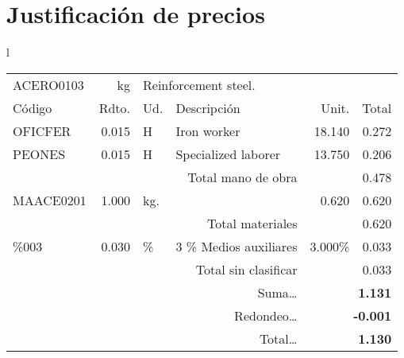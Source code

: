 \documentclass{book}%
\begin{document}
%
\normalsize%
\part{Justificación de precios}%
\label{sec:Justificacindeprecios}%
\small%
\begin{longtable}{l}%
\begin{tabular}{l r l p{4cm} r r}%
ACERO0103&kg&\multicolumn{4}{p{7cm}}{Reinforcement steel.}\\%
Código&Rdto.&Ud.&Descripción&Unit.&Total\\%
\hline%
OFICFER&0.015&H&Iron worker&18.140&0.272\\%
PEONES&0.015&H&Specialized laborer&13.750&0.206\\%
\multicolumn{4}{r}{Total mano de obra}&&0.478\\%
MAACE0201&1.000&kg.&&0.620&0.620\\%
\multicolumn{4}{r}{Total materiales}&&0.620\\%
\%003&0.030&\%&3 \% Medios auxiliares&3.000\%&0.033\\%
\multicolumn{4}{r}{Total sin clasificar}&&0.033\\%
\multicolumn{4}{r}{Suma\ldots}&\multicolumn{2}{r}{\textbf{1.131}}\\%
\multicolumn{4}{r}{Redondeo\ldots}&\multicolumn{2}{r}{\textbf{{-}0.001}}\\%
\multicolumn{4}{r}{Total\ldots}&\multicolumn{2}{r}{\textbf{1.130}}\\%
\end{tabular}\\%
\end{longtable}%
\normalsize

%
\end{document}
